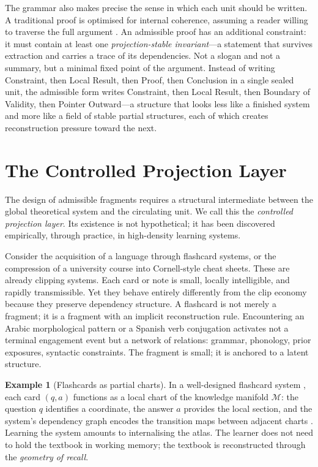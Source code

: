 \documentclass{amsart}
\theoremstyle{plain}
\theoremstyle{definition}
\newtheorem{example}[theorem]{Example}
\theoremstyle{remark}
\newcommand{\Man}{\mathcal{M}}
\begin{document}
The grammar also makes precise the sense in which each unit should be written.  A
traditional proof is optimised for internal coherence, assuming a reader willing to
traverse the full argument \cite{lurie2009}.  An admissible proof has an additional
constraint: it must contain at least one \emph{projection-stable invariant}---a
statement that survives extraction and carries a trace of its dependencies.  Not a
slogan and not a summary, but a minimal fixed point of the argument.  Instead of
writing Constraint, then Local Result, then Proof, then Conclusion in a single
sealed unit, the admissible form writes Constraint, then Local Result, then
Boundary of Validity, then Pointer Outward---a structure that looks less like a
finished system and more like a field of stable partial structures, each of which
creates reconstruction pressure toward the next.

\section{The Controlled Projection Layer}
\label{sec:projection}

The design of admissible fragments requires a structural intermediate between the
global theoretical system and the circulating unit.  We call this the
\emph{controlled projection layer}.  Its existence is not hypothetical; it has been
discovered empirically, through practice, in high-density learning systems.

Consider the acquisition of a language through flashcard systems, or the
compression of a university course into Cornell-style cheat sheets.  These are
already clipping systems.  Each card or note is small, locally intelligible, and
rapidly transmissible.  Yet they behave entirely differently from the clip economy
because they preserve dependency structure.  A flashcard is not merely a fragment;
it is a fragment with an implicit reconstruction rule.  Encountering an Arabic
morphological pattern or a Spanish verb conjugation activates not a terminal
engagement event but a network of relations: grammar, phonology, prior exposures,
syntactic constraints.  The fragment is small; it is anchored to a latent structure.

\begin{example}[Flashcards as partial charts]
  \label{ex:flashcard}
  In a well-designed flashcard system \cite{wozniak1990,cepeda2006}, each card
  $(q, a)$ functions as a local chart of the knowledge manifold $\Man$: the
  question $q$ identifies a coordinate, the answer $a$ provides the local section,
  and the system's dependency graph encodes the transition maps between adjacent
  charts \cite{spivak2014}.  Learning the system amounts to internalising the
  atlas.  The learner does not need to hold the textbook in working memory; the
  textbook is reconstructed through the \emph{geometry of recall}.
\end{example}
\end{document}
